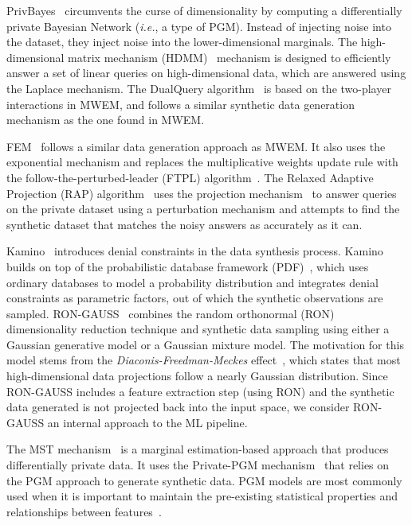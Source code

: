 \documentclass[parskip=full]{scrartcl}
\begin{document}
PrivBayes~\cite{zhang2017privbayes} circumvents the curse of dimensionality by
computing a differentially private Bayesian Network (\textit{i.e.}, a type of
PGM). Instead of injecting noise into the dataset, they inject noise into the
lower-dimensional marginals. The high-dimensional matrix mechanism
(HDMM)~\cite{mckenna2018optimizing} mechanism is designed to efficiently
answer a set of linear queries on high-dimensional data, which are answered
using the Laplace mechanism. The DualQuery algorithm~\cite{gaboardi2014dual}
is based on the two-player interactions in MWEM, and follows a similar
synthetic data generation mechanism as the one found in MWEM\@.

FEM~\cite{vietri2020new} follows a similar data generation approach as MWEM\@.
It also uses the exponential mechanism and replaces the multiplicative weights
update rule with the follow-the-perturbed-leader (FTPL)
algorithm~\cite{kalai2005efficient}. The Relaxed Adaptive Projection (RAP)
algorithm~\cite{aydore2021differentially} uses the projection
mechanism~\cite{nikolov2013geometry} to answer queries on the private dataset
using a perturbation mechanism and attempts to find the synthetic dataset that
matches the noisy answers as accurately as it can.

Kamino~\cite{ge2021kamino} introduces denial constraints in the data synthesis
process. Kamino builds on top of the probabilistic database framework
(PDF)~\cite{de2019formal, suciu2011probabilistic}, which uses ordinary
databases to model a probability distribution and integrates denial
constraints as parametric factors, out of which the synthetic observations are
sampled. RON-GAUSS~\cite{chanyaswad2019ron} combines the random orthonormal
(RON) dimensionality reduction technique and synthetic data sampling using
either a Gaussian generative model or a Gaussian mixture model. The motivation
for this model stems from the \textit{Diaconis-Freedman-Meckes}
effect~\cite{meckes2012projections}, which states that most high-dimensional
data projections follow a nearly Gaussian distribution. Since RON-GAUSS
includes a feature extraction step (using RON) and the synthetic data
generated is not projected back into the input space, we consider RON-GAUSS an
internal approach to the ML pipeline.

The MST mechanism~\cite{mckenna2021winning} is a marginal estimation-based
approach that produces differentially private data. It uses the Private-PGM
mechanism~\cite{mckenna2019graphical} that relies on the PGM approach to
generate synthetic data. PGM models are most commonly used when it is
important to maintain the pre-existing statistical properties and
relationships between features~\cite{young2009using}.
\end{document}
